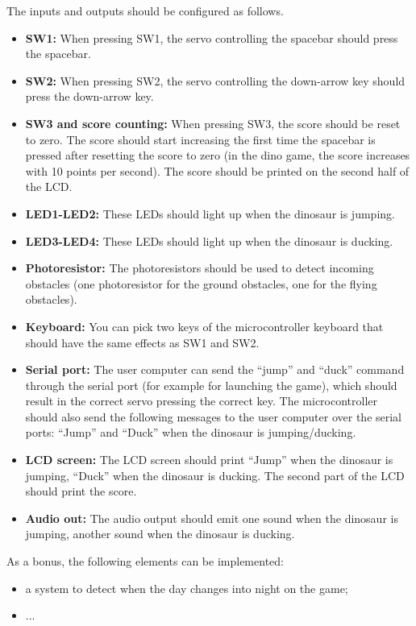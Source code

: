 The inputs and outputs should be configured as follows. 
\begin{itemize}
	\item \textbf{SW1: } When pressing SW1, the servo controlling the spacebar should press the spacebar. 
	\item \textbf{SW2: } When pressing SW2, the servo controlling the down-arrow key should press the down-arrow key. 
	\item \textbf{SW3 and score counting: } When pressing SW3, the score should be reset to zero. The score should start increasing the first time the spacebar is pressed after resetting the score to zero (in the dino game, the score increases with 10 points per second). The score should be printed on the second half of the LCD. 
	\item \textbf{LED1-LED2: } These LEDs should light up when the dinosaur is jumping. 
	\item \textbf{LED3-LED4: } These LEDs should light up when the dinosaur is ducking. 
	\item \textbf{Photoresistor: } The photoresistors should be used to detect incoming obstacles (one photoresistor for the ground obstacles, one for the flying obstacles). 
	\item \textbf{Keyboard: } You can pick two keys of the microcontroller keyboard that should have the same effects as SW1 and SW2. 
	\item \textbf{Serial port: } The user computer can send the ``jump'' and ``duck'' command through the serial port (for example for launching the game), which should result in the correct servo pressing the correct key. The microcontroller should also send the following messages to the user computer over the serial ports: ``Jump'' and ``Duck'' when the dinosaur is jumping/ducking. 
	\item \textbf{LCD screen: } The LCD screen should print ``Jump'' when the dinosaur is jumping, ``Duck'' when the dinosaur is ducking. The second part of the LCD should print the score. 
	\item \textbf{Audio out: } The audio output should emit one sound when the dinosaur is jumping, another sound when the dinosaur is ducking. 
\end{itemize}

As a bonus, the following elements can be implemented: 
\begin{itemize}
	\item a system to detect when the day changes into night on the game; 
	\item ...
\end{itemize}



